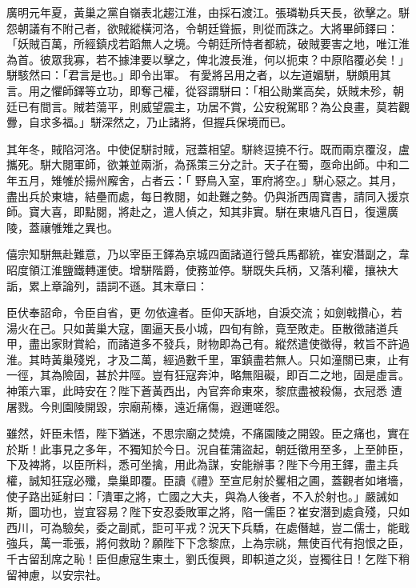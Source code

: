 \begin{pinyinscope}
 廣明元年夏，黃巢之黨自嶺表北趨江淮，由採石渡江。張璘勒兵天長，欲擊之。駢怨朝議有不附己者，欲賊縱橫河洛，令朝廷聳振，則從而誅之。大將畢師鐸曰：「妖賊百萬，所經鎮戍若蹈無人之境。今朝廷所恃者都統，破賊要害之地，唯江淮為首。彼眾我寡，若不據津要以擊之，俾北渡長淮，何以扼束？中原陷覆必矣！」駢駭然曰：「君言是也。」即令出軍。
 有愛將呂用之者，以左道媚駢，駢頗用其言。用之懼師鐸等立功，即奪己權，從容謂駢曰：「相公勛業高矣，妖賊未殄，朝廷已有間言。賊若蕩平，則威望震主，功居不賞，公安稅駕耶？為公良畫，莫若觀釁，自求多福。」駢深然之，乃止諸將，但握兵保境而已。



 其年冬，賊陷河洛。中使促駢討賊，冠蓋相望。駢終逗撓不行。既而兩京覆沒，盧攜死。駢大閱軍師，欲兼並兩浙，為孫策三分之計。天子在蜀，亟命出師。中和二年五月，雉雊於揚州廨舍，占者云：「
 野鳥入室，軍府將空。」駢心惡之。其月，盡出兵於東塘，結壘而處，每日教閱，如赴難之勢。仍與浙西周寶書，請同入援京師。寶大喜，即點閱，將赴之，遣人偵之，知其非實。駢在東塘凡百日，復還廣陵，蓋禳雊雉之異也。



 僖宗知駢無赴難意，乃以宰臣王鐸為京城四面諸道行營兵馬都統，崔安潛副之，韋昭度領江淮鹽鐵轉運使。增駢階爵，使務並停。駢既失兵柄，又落利權，攘袂大詬，累上章論列，語詞不遜。其末章曰：



 臣伏奉詔命，令臣自省，更
 勿依違者。臣仰天訴地，自淚交流；如劍戟攢心，若湯火在己。只如黃巢大寇，圍逼天長小城，四旬有餘，竟至敗走。臣散徵諸道兵甲，盡出家財賞給，而諸道多不發兵，財物即為己有。縱然遣使徵得，敕旨不許過淮。其時黃巢殘兇，才及二萬，經過數千里，軍鎮盡若無人。只如潼關已東，止有一徑，其為險固，甚於井陘。豈有狂寇奔沖，略無阻礙，即百二之地，固是虛言。神策六軍，此時安在？陛下蒼黃西出，內官奔命東來，黎庶盡被殺傷，衣冠悉
 遭屠戮。今則園陵開毀，宗廟荊榛，遠近痛傷，遐邇嗟怨。



 雖然，奸臣未悟，陛下猶迷，不思宗廟之焚燒，不痛園陵之開毀。臣之痛也，實在於斯！此事見之多年，不獨知於今日。況自萑蒲盜起，朝廷徵用至多，上至帥臣，下及裨將，以臣所料，悉可坐擒，用此為謀，安能辦事？陛下今用王鐸，盡主兵權，誠知狂寇必殲，梟巢即覆。臣讀《禮》至宣尼射於矍相之圃，蓋觀者如堵墻，使子路出延射曰：「潰軍之將，亡國之大夫，與為人後者，不入於射也。」嚴誡如
 斯，圖功也，豈宜容易？陛下安忍委敗軍之將，陷一儒臣？崔安潛到處貪殘，只如西川，可為驗矣，委之副貳，詎可平戎？況天下兵驕，在處僭越，豈二儒士，能戢強兵，萬一乖張，將何救助？願陛下下念黎庶，上為宗祧，無使百代有抱恨之臣，千古留刮席之恥！臣但慮寇生東土，劉氏復興，即軹道之災，豈獨往日！乞陛下稍留神慮，以安宗社。




\end{pinyinscope}
